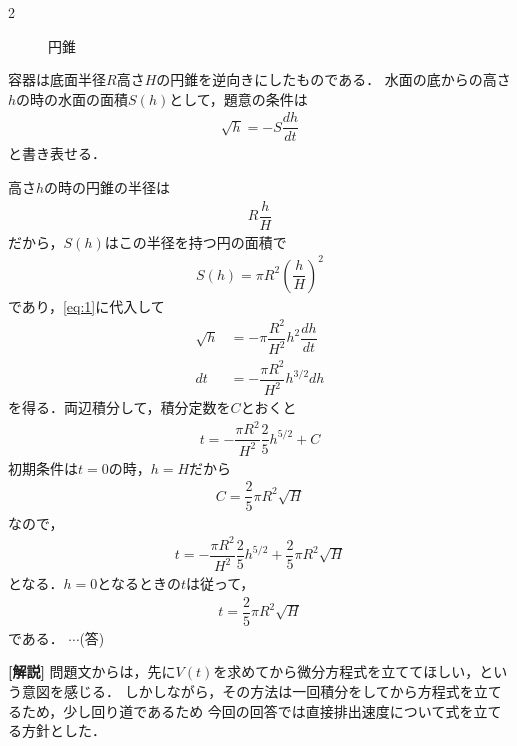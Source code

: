 \documentclass[../../main.tex]{subfiles}
\begin{document}
\begin{multicols}{2}
\begin{figure}[H]
    \caption{円錐}
  \end{figure}

  容器は底面半径$R$高さ$H$の円錐を逆向きにしたものである．
  水面の底からの高さ$h$の時の水面の面積$S(h)$として，題意の条件は
  \begin{align}
    \sqrt{h} = -S \dfrac{dh}{dt} \label{eq:1}
  \end{align}
  と書き表せる．

  高さ$h$の時の円錐の半径は
  \begin{align}
    R\dfrac{h}{H}
  \end{align}
  だから，$S(h)$はこの半径を持つ円の面積で
  \begin{align}
    S(h) = \pi R^2 \left(\dfrac{h}{H}\right)^2
  \end{align}
  であり，\cref{eq:1}に代入して
  \begin{align}
    \sqrt{h} & = -\pi \dfrac{R^2}{H^2} h^2 \dfrac{dh}{dt}   \nonumber  \\
    dt       & = -\dfrac{\pi R^2}{H^2} h^{3/2} dh \label{eq:2}
  \end{align}
  を得る．両辺積分して，積分定数を$C$とおくと
  \begin{align}
    t = -\dfrac{\pi R^2}{H^2} \dfrac{2}{5} h^{5/2} + C
  \end{align}
  初期条件は$t=0$の時，$h=H$だから
  \begin{align}
    C= \dfrac{2}{5} \pi R^2 \sqrt{H}
  \end{align}
  なので，
  \begin{align}
    t = -\dfrac{\pi R^2}{H^2} \dfrac{2}{5} h^{5/2} + \dfrac{2}{5} \pi R^2 \sqrt{H}
  \end{align}
  となる．$h=0$となるときの$t$は従って，
  \begin{align}
    t = \dfrac{2}{5} \pi R^2 \sqrt{H}
  \end{align}
  である． $\cdots$(答)

  {\bf [解説]}
  問題文からは，先に$V(t)$を求めてから微分方程式を立ててほしい，という意図を感じる．
  しかしながら，その方法は一回積分をしてから方程式を立てるため，少し回り道であるため
  今回の回答では直接排出速度について式を立てる方針とした．


\end{multicols}
\end{document}
